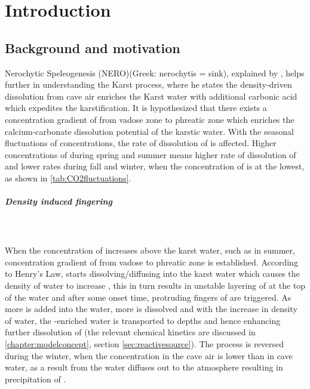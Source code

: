 \chapter{Introduction}\label{chapter:introduction}
\thispagestyle{empty}
\section{Background and motivation}
Nerochytic Speleogenesis (NERO)(Greek: nerochytis = sink), explained by \citet{Scherzer2017}, helps further in understanding the Karst process, where he states the density-driven  dissolution from cave air enriches the Karst water with additional carbonic acid which expedites the karstification. It is hypothesized that there exists a concentration gradient of  from vadose zone to phreatic zone which enriches the calcium-carbonate dissolution potential of the karstic water. With the seasonal fluctuations of  concentrations, the rate of dissolution of  is affected. Higher concentrations of  during spring and summer means higher rate of dissolution of  and lower rates during fall and winter, when the concentration of  is at the lowest, as shown in \cref{tab:CO2fluctuations}.

\paragraph*{Density induced fingering}\mbox{}\\ \\
When the concentration of  increases above the karst water, such as in summer, concentration gradient of  from vadose to phreatic zone is established. According to Henry's Law,  starts dissolving/diffusing into the karst water which causes the density of water to increase \cite{garcia2001density}, this in turn results in unstable layering of  at the top of the water and after some onset time, protruding fingers of  are triggered. As more  is added into the water, more  is dissolved and with the increase in density of water, the -enriched water is transported to depths and hence enhancing further dissolution of  (the relevant chemical kinetics are discussed in \cref{chapter:modelconcept}, section \cref{sec:reactivesource}). The process is reversed during the winter, when the  concentration in the cave air is lower than in cave water, as a result  from the water diffuses out to the atmosphere resulting in precipitation of .\\ 

